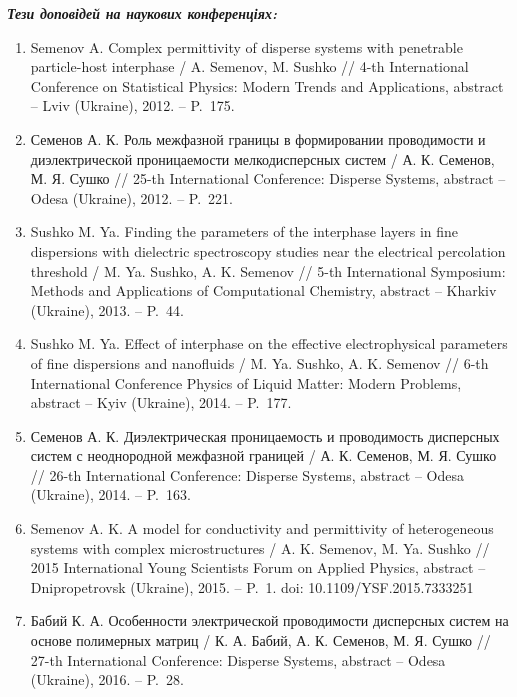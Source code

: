 \vskip 15pt
\textbf{\textit{Тези доповідей на наукових конференціях:}}
\begin{enumerate}[leftmargin=0.8cm]
	\item Semenov A. Complex permittivity of disperse systems with penetrable particle-host interphase / A. Semenov, M. Sushko // 4-th International Conference on Statistical Physics: Modern Trends and Applications, abstr\-act -- Lviv (Ukraine), 2012. -- P.~175.
	
	\item Семенов А. К. Роль межфазной границы в формировании проводимости  и диэлектрической проницаемости мелкодисперсных систем / А. К. Семенов, М. Я. Сушко // 25-th International Conference: Disperse Systems, abstract -- Odesa (Ukraine), 2012. -- P.~221.
	
	\item Sushko M. Ya. Finding the parameters of the interphase layers in fine dispersions with dielectric spectroscopy studies near the electrical percolation threshold / M. Ya. Sushko, A. K. Semenov // 5-th International Symposium: Methods and Applications of Computational Chemistry, abstract -- Kharkiv (Ukraine), 2013. -- P.~44.
	
	\item Sushko M. Ya. Effect of interphase on the effective electrophysical para\-meters of fine dispersions and nanofluids / M. Ya. Sushko, A. K. Semenov // 6-th International Conference Physics  of  Liquid  Matter:  Modern Prob\-lems, abstract -- Kyiv (Ukraine), 2014. -- P.~177.
	
	\item Семенов А. К. Диэлектрическая проницаемость и проводимость дисперсных систем с неоднородной межфазной границей / А. К. Семенов, М. Я. Сушко // 26-th International Conference: Disperse Systems, abstract -- Odesa (Ukraine), 2014. -- P.~163.
	
	\item Semenov A. K. A model for conductivity and permittivity of heterogene\-ous systems with complex microstructures / A. K. Semenov, M. Ya. Sushko // 2015 International Young Scientists Forum on Applied Physics, abstract -- Dnipropetrovsk (Ukraine), 2015. -- P.~1.
	doi: 10.1109/YSF.2015.7333251
	
	\item Бабий К. А. Особенности электрической проводимости дисперсных систем на основе полимерных матриц / К. А. Бабий, А. К. Семенов, М. Я. Сушко // 27-th International Conference: Disperse Systems, abstr\-act -- Odesa (Ukraine), 2016. -- P.~28.
	

\end{enumerate}
